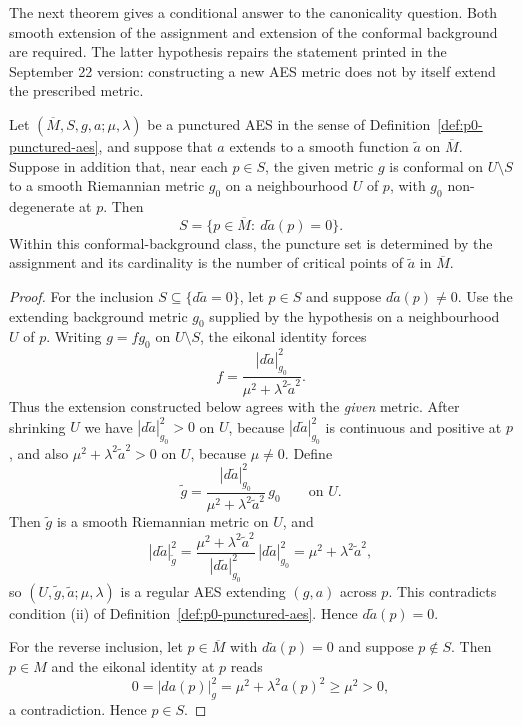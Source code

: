 The next theorem gives a conditional answer to the canonicality question.
Both smooth extension of the assignment and extension of the conformal
background are required.  The latter hypothesis repairs the statement printed
in the September 22 version: constructing a new AES metric does not by itself
extend the prescribed metric.

\begin{theorem}
\label{thm:p0-punctures-are-critical}
Let $(\overline M,S,g,a;\mu,\lambda)$ be a punctured AES in the sense of
Definition~\ref{def:p0-punctured-aes}, and suppose that $a$ extends to a smooth
function $\widetilde a$ on $\overline M$.  Suppose in addition that, near each
$p\in S$, the given metric $g$ is conformal on $U\setminus S$ to a smooth
Riemannian metric $g_0$ on a neighbourhood $U$ of $p$, with $g_0$ non-degenerate
at $p$.  Then
\begin{equation}\label{eq:p0-punctures-are-critical}
  S=\bigl\{p\in\overline M:\ d\widetilde a(p)=0\bigr\} .
\end{equation}
Within this conformal-background class, the puncture set is determined by the
assignment and its cardinality is the number of critical points of
$\widetilde a$ in $\overline M$.
\end{theorem}

\begin{proof}
For the inclusion $S\subseteq\{d\widetilde a=0\}$, let $p\in S$ and suppose
$d\widetilde a(p)\ne0$.  Use the extending background metric $g_0$ supplied by the hypothesis on a
neighbourhood $U$ of $p$.  Writing $g=f g_0$ on $U\setminus S$, the eikonal
identity forces
\[
  f=\frac{|d\widetilde a|_{g_0}^2}{\mu^2+\lambda^2\widetilde a^2}.
\]
Thus the extension constructed below agrees with the \emph{given} metric.
After shrinking $U$ we have $|d\widetilde a|^2_{g_0}>0$ on $U$, because
$|d\widetilde a|^2_{g_0}$ is continuous and positive at $p$, and also
$\mu^2+\lambda^2\widetilde a^2>0$ on $U$, because $\mu\ne0$.  Define
\[
  \widetilde g=\frac{|d\widetilde a|_{g_0}^2}{\mu^2+\lambda^2\widetilde a^2}\,g_0
  \qquad\text{on }U .
\]
Then $\widetilde g$ is a smooth Riemannian metric on $U$, and
\[
  |d\widetilde a|^2_{\widetilde g}
  =\frac{\mu^2+\lambda^2\widetilde a^2}{|d\widetilde a|_{g_0}^2}
   \,|d\widetilde a|_{g_0}^2
  =\mu^2+\lambda^2\widetilde a^2 ,
\]
so $(U,\widetilde g,\widetilde a;\mu,\lambda)$ is a regular AES extending
$(g,a)$ across $p$.  This contradicts condition (ii) of
Definition~\ref{def:p0-punctured-aes}.  Hence $d\widetilde a(p)=0$.

For the reverse inclusion, let $p\in\overline M$ with $d\widetilde a(p)=0$ and
suppose $p\notin S$.  Then $p\in M$ and the eikonal identity at $p$ reads
\[
  0=|da(p)|_g^2=\mu^2+\lambda^2a(p)^2\ge\mu^2>0 ,
\]
a contradiction.  Hence $p\in S$.
\end{proof}

